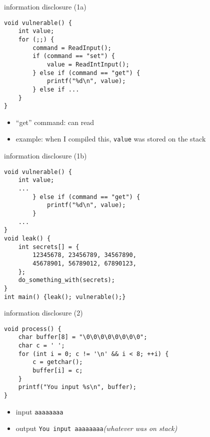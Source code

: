 \begin{frame}[fragile,label=infoDisc1a]{information disclosure (1a)}
\lstset{
    language=C++,
    style=smaller
}
\begin{lstlisting}
void vulnerable() {
    int value;
    for (;;) {
        command = ReadInput();
        if (command == "set") {
            value = ReadIntInput();
        } else if (command == "get") {
            printf("%d\n", value);
        } else if ...
    }
}
\end{lstlisting}
\begin{itemize}
\item ``get'' command: can read 
\item example: when I compiled this, \texttt{value} was stored on the stack
\end{itemize}
\end{frame}

\begin{frame}[fragile,label=infoDisc1b]{information disclosure (1b)}
\lstset{
    language=C++,
    style=smaller
}
\begin{lstlisting}
void vulnerable() {
    int value;
    ...
        } else if (command == "get") {
            printf("%d\n", value);
        }
    ...
}
void leak() {
    int secrets[] = { 
        12345678, 23456789, 34567890,
        45678901, 56789012, 67890123,
    };  
    do_something_with(secrets);
}
int main() {leak(); vulnerable();}
\end{lstlisting}
\end{frame}

\begin{frame}[fragile,label=infoDisc2]{information disclosure (2)}
\lstset{
    language=C,
    style=smaller
}
\begin{lstlisting}
void process() {
    char buffer[8] = "\0\0\0\0\0\0\0\0";
    char c = ' ';
    for (int i = 0; c != '\n' && i < 8; ++i) {
        c = getchar();
        buffer[i] = c;
    }
    printf("You input %s\n", buffer);
}
\end{lstlisting}
\begin{itemize}
\item input \verb|aaaaaaaa|
\item output \verb|You input aaaaaaaa|{\it (whatever was on stack)}
\end{itemize}
\end{frame}

